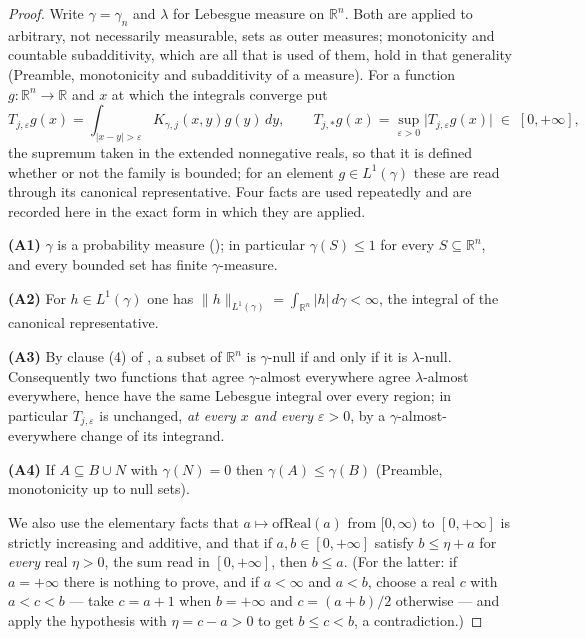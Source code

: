 \begin{proof}
Write $\gamma = \gamma_n$ and $\lambda$ for Lebesgue measure on $\mathbb{R}^n$.
Both are applied to arbitrary, not necessarily measurable, sets as outer
measures; monotonicity and countable subadditivity, which are all that is used
of them, hold in that generality (Preamble, monotonicity and subadditivity of
a measure).  For a function $g : \mathbb{R}^n \to \mathbb{R}$ and $x$ at which
the integrals converge put
\[
  T_{j,\varepsilon}g(x) = \int_{|x-y|>\varepsilon}K_{\gamma,j}(x,y)g(y)\,dy ,
  \qquad
  T_{j,*}g(x) = \sup_{\varepsilon>0}
     \bigl|T_{j,\varepsilon}g(x)\bigr| \;\in\;[0,+\infty] ,
\]
the supremum taken in the extended nonnegative reals, so that it is defined
whether or not the family is bounded; for an element $g \in L^1(\gamma)$ these
are read through its canonical representative.  Four facts are used
repeatedly and are recorded here in the exact form in which they are applied.

\textbf{(A1)} $\gamma$ is a probability measure (); in
particular $\gamma(S) \leq 1$ for every $S \subseteq \mathbb{R}^n$, and every
bounded set has finite $\gamma$-measure.

\textbf{(A2)} For $h \in L^1(\gamma)$ one has
$\|h\|_{L^1(\gamma)} = \int_{\mathbb{R}^n}|h|\,d\gamma < \infty$, the integral
of the canonical representative.

\textbf{(A3)} By clause (4) of , a subset
of $\mathbb{R}^n$ is $\gamma$-null if and only if it is $\lambda$-null.
Consequently two functions that agree $\gamma$-almost everywhere agree
$\lambda$-almost everywhere, hence have the same Lebesgue integral over every
region; in particular $T_{j,\varepsilon}$ is unchanged, \emph{at every $x$ and
every $\varepsilon > 0$}, by a $\gamma$-almost-everywhere change of its
integrand.

\textbf{(A4)} If $A \subseteq B \cup N$ with $\gamma(N) = 0$ then
$\gamma(A) \leq \gamma(B)$ (Preamble, monotonicity up to null sets).

We also use the elementary facts that $a \mapsto \mathrm{ofReal}(a)$ from
$[0,\infty)$ to $[0,+\infty]$ is strictly increasing and additive, and that if
$a, b \in [0,+\infty]$ satisfy $b \leq \eta + a$ for \emph{every} real
$\eta > 0$, the sum read in $[0,+\infty]$, then $b \leq a$.  (For the latter: if $a = +\infty$ there is nothing
to prove, and if $a < \infty$ and $a < b$, choose a real $c$ with $a < c < b$
--- take $c = a+1$ when $b = +\infty$ and $c = (a+b)/2$ otherwise --- and apply
the hypothesis with $\eta = c - a > 0$ to get $b \leq c < b$, a contradiction.)


\end{proof}
